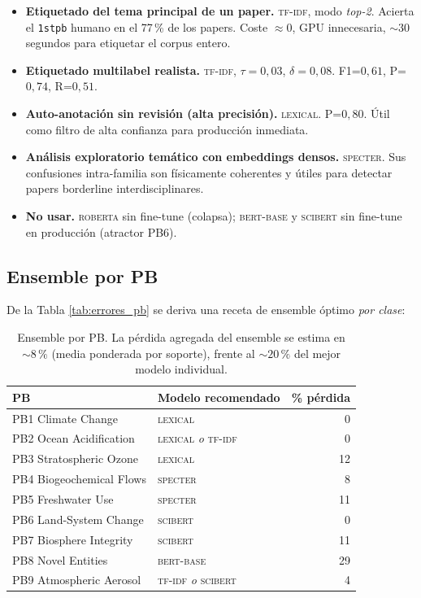 \documentclass[11pt,a4paper]{article}
\begin{document}
\begin{itemize}
\item \textbf{Etiquetado del tema principal de un paper.} \textsc{tf-idf}, modo \emph{top-2}. Acierta el \texttt{1stpb} humano en el 77\,\% de los papers. Coste $\approx 0$, GPU innecesaria, $\sim 30$ segundos para etiquetar el corpus entero.
\item \textbf{Etiquetado multilabel realista.} \textsc{tf-idf}, $\tau=0{,}03$, $\delta=0{,}08$. F1=$0{,}61$, P=$0{,}74$, R=$0{,}51$.
\item \textbf{Auto-anotación sin revisión (alta precisión).} \textsc{lexical}. P=$0{,}80$. Útil como filtro de alta confianza para producción inmediata.
\item \textbf{Análisis exploratorio temático con embeddings densos.} \textsc{specter}. Sus confusiones intra-familia son físicamente coherentes y útiles para detectar papers borderline interdisciplinares.
\item \textbf{No usar.} \textsc{roberta} sin fine-tune (colapsa); \textsc{bert-base} y \textsc{scibert} sin fine-tune en producción (atractor PB6).
\end{itemize}

\subsection{Ensemble por PB}

De la Tabla \ref{tab:errores_pb} se deriva una receta de ensemble óptimo \emph{por clase}:

\begin{table}[h]
\centering
\small
\begin{tabular}{l l r}
\toprule
\textbf{PB} & \textbf{Modelo recomendado} & \textbf{\% pérdida} \\
\midrule
PB1 Climate Change & \textsc{lexical} & 0 \\
PB2 Ocean Acidification & \textsc{lexical} \emph{o} \textsc{tf-idf} & 0 \\
PB3 Stratospheric Ozone & \textsc{lexical} & 12 \\
PB4 Biogeochemical Flows & \textsc{specter} & 8 \\
PB5 Freshwater Use & \textsc{specter} & 11 \\
PB6 Land-System Change & \textsc{scibert} & 0 \\
PB7 Biosphere Integrity & \textsc{scibert} & 11 \\
PB8 Novel Entities & \textsc{bert-base} & 29 \\
PB9 Atmospheric Aerosol & \textsc{tf-idf} \emph{o} \textsc{scibert} & 4 \\
\bottomrule
\end{tabular}
\caption{Ensemble por PB. La pérdida agregada del ensemble se estima en $\sim 8\,\%$ (media ponderada por soporte), frente al $\sim 20\,\%$ del mejor modelo individual.}
\label{tab:ensemble}
\end{table}
\end{document}
